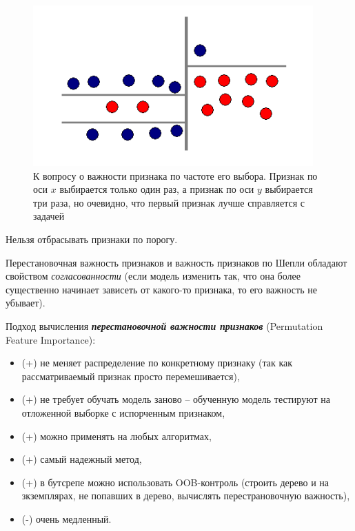 \documentclass[%
	11pt,
	a4paper,
	utf8,
		]{article}
\begin{document}
\begin{figure}[h]
	\centering
	\includegraphics[scale=1.]{figures/feature_imp.png}
	\caption{ К вопросу о важности признака по частоте его выбора. Признак по оси $ x $ выбирается только один раз, а признак по оси $ y $ выбирается три раза, но очевидно, что первый признак лучше справляется с задачей }\label{fig:feature_imp}
\end{figure}

{\color{red}Нельзя отбрасывать признаки по порогу.}

Перестановочная важность признаков и важность признаков по Шепли обладают свойством \emph{согласованности} (если модель изменить так, что она более существенно начинает зависеть от какого-то признака, то его важность не убывает).

Подход вычисления \textbf{\itshape перестановочной важности признаков} (Permutation Feature Importance):
\begin{itemize}
	\item (+) не меняет распределение по конкретному признаку (так как рассматриваемый признак просто перемешивается),
	
	\item (+) не требует обучать модель заново -- обученную модель тестируют на отложенной выборке с испорченным признаком,
	
	\item (+) можно применять на любых алгоритмах,
	
	\item (+) самый надежный метод,
	
	\item (+) в бутсрепе можно использовать OOB-контроль (строить дерево и на зкземплярах, не попавших в дерево, вычислять перестрановочную важность),
	
	\item (-) очень медленный.
\end{itemize}
\end{document}
